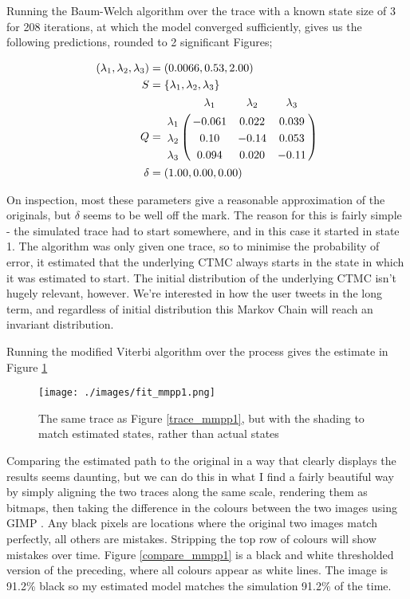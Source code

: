Running the Baum-Welch algorithm over the trace with a known state size of 3 for 208 iterations, at which the model converged sufficiently, gives us the following predictions, rounded to 2 significant Figures;

\begin{align*}
(\lambda_1,\lambda_2,\lambda_3) &= (0.0066,0.53,2.00)\\
S &= \{\lambda_1,\lambda_2,\lambda_3\}\\
Q &= \bordermatrix{      & \lambda_1 & \lambda_2 & \lambda_3\cr
                \lambda_1 & -0.061 & 0.022 & 0.039 \cr
                \lambda_2 & 0.10 & -0.14 & 0.053 \cr
                \lambda_3 & 0.094 & 0.020 & -0.11 \cr
			}\\
\delta &= (1.00,0.00,0.00)
\end{align*}

On inspection, most these parameters give a reasonable approximation of the originals, but $\delta$ seems to be well off the mark. The reason for this is fairly simple - the simulated trace had to start somewhere, and in this case it started in state 1. The algorithm was only given one trace, so to minimise the probability of error, it estimated that the underlying CTMC always starts in the state in which it was estimated to start. The initial distribution of the underlying CTMC isn't hugely relevant, however. We're interested in how the user tweets in the long term, and regardless of initial distribution this Markov Chain will reach an invariant distribution.

Running the modified Viterbi algorithm over the process gives the estimate in Figure \ref{fit_mmpp1}

\begin{figure}[h!]
\centering
\texttt{[image: ./images/fit\_mmpp1.png]}
\caption{The same trace as Figure \ref{trace_mmpp1}, but with the shading to match estimated states, rather than actual states}
\label{fit_mmpp1}
\end{figure}

Comparing the estimated path to the original in a way that clearly displays the results seems daunting, but we can do this in what I find a fairly beautiful way by simply aligning the two traces along the same scale, rendering them as bitmaps, then taking the difference in the colours between the two images using GIMP \cite[eqn 8.15]{gimpdiff}. Any black pixels are locations where the original two images match perfectly, all others are mistakes. Stripping the top row of colours will show mistakes over time. Figure \ref{compare_mmpp1} is a black and white thresholded \cite{gimpthresh} version of the preceding, where all colours appear as white lines. The image is 91.2\% black so my estimated model matches the simulation 91.2\% of the time.

